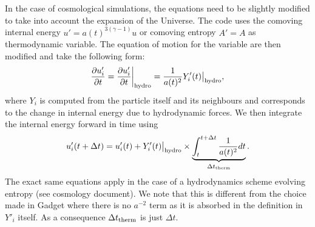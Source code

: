 \documentclass[fleqn, usenatbib, useAMS, a4paper]{mnras}
\begin{document}
In the case of cosmological simulations, the equations need to be
slightly modified to take into account the expansion of the
Universe. The code uses the comoving internal energy $u' =
a(t)^{3(\gamma-1)}u$ or comoving entropy $A'=A$ as thermodynamic
variable. The equation of motion for the variable are then modified
and take the following form:
\begin{equation}
  \frac{\partial u'_i}{\partial t} = \frac{\partial u'_i}{\partial
    t}\bigg|_{\rm hydro}  = \frac{1}{a(t)^2} Y'_i(t)\big|_{\rm
    hydro},
\end{equation}
where $Y_i$ is computed from the particle itself and its neighbours
and corresponds to the change in internal energy due to hydrodynamic
forces. We then integrate the internal energy forward in time using
\begin{equation}
  u'_i(t+\Delta t) = u'_i(t) + Y'_i(t)\big|_{\rm hydro} \times \underbrace{\int_t^{t+\Delta t}
  \frac{1}{a(t)^2} dt}_{\Delta t_{\rm therm}}.
\end{equation}
The exact same equations apply in the case of a hydrodynamics scheme
evolving entropy (see cosmology document). We note that this is
different from the choice made in Gadget where there is no $a^{-2}$
term as it is absorbed in the definition in $Y'_i$ itself. As a
consequence $\Delta t_{\rm therm}$ is just $\Delta t$.
\end{document}
